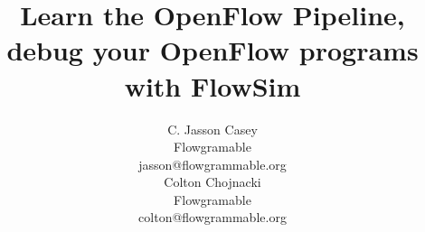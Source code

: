 \documentclass[conference]{sig-alternate}
\begin{document}
\title{Learn the OpenFlow Pipeline, debug your OpenFlow programs with FlowSim}

\author{
  \alignauthor C. Jasson Casey \\
  \affaddr Flowgramable \\
  \email jasson@flowgrammable.org \\
  \alignauthor Colton Chojnacki \\
  \affaddr Flowgramable \\
  \email colton@flowgrammable.org \\
}

\maketitle

\begin{abstract}
  
\end{abstract}

  
  
  
  
  
  
  
\end{document}
